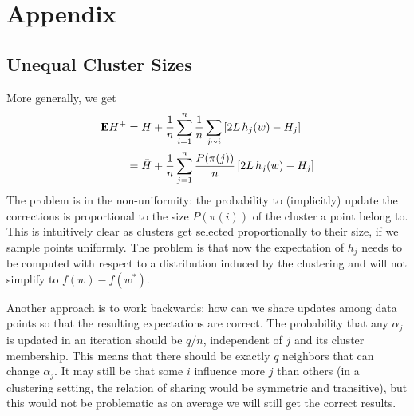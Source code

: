 \documentclass{article}
\newcommand{\E}{{\bf E}}
\begin{document}
%

\newpage


\section{Appendix}

\subsection{Unequal Cluster Sizes}

More generally, we get 
\begin{align}
\E \bar H^+ & = \bar H + \frac 1n \sum_{i=1}^n \frac 1n \sum_{j \sim i} \left[ 2L \, h_j(w) - H_j \right] \\
& = \bar H + \frac 1n \sum_{j=1}^n \frac{P(\pi(j))}{n} \left[ 2L \, h_j(w) - H_j \right] 
\end{align}
The problem is in the non-uniformity: the probability to (implicitly) update the corrections is proportional to the size $P(\pi(i))$ of the cluster a point belong to. This is intuitively clear as clusters get selected proportionally to their size, if we sample points uniformly. The problem is that now the expectation of $h_j$ needs to be computed with respect to a distribution induced by the clustering and will not simplify to $f(w)-f(w^*)$.  

Another approach is to work backwards: how can we share updates among data points so that the resulting expectations are correct. The probability that any $\alpha_j$ is updated in an iteration should be $q/n$, independent of $j$ and its cluster membership. This means that there should be exactly $q$ neighbors that can change $\alpha_j$. It may still be that some $i$ influence more $j$ than others (in a clustering setting, the relation of sharing would be symmetric and transitive), but this would not be problematic as on average we will still get the correct results. 
\end{document}
